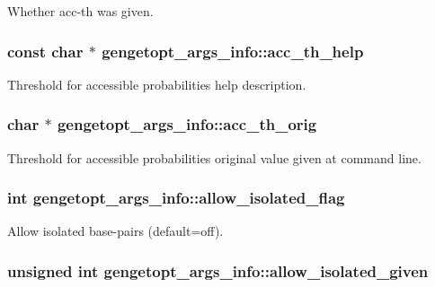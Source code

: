 Whether acc-\/th was given. 

\hypertarget{structgengetopt__args__info_a6c25c2ca04d50ecd361603514540046b}{
\subsubsection[{acc\+\_\+th\+\_\+help}]{\setlength{\rightskip}{0pt plus 5cm}const char $\ast$ gengetopt\+\_\+args\+\_\+info\+::acc\+\_\+th\+\_\+help}}\label{structgengetopt__args__info_a6c25c2ca04d50ecd361603514540046b}


Threshold for accessible probabilities help description. 

\hypertarget{structgengetopt__args__info_ae8040a2293d3668f9afd87c7cc487591}{
\subsubsection[{acc\+\_\+th\+\_\+orig}]{\setlength{\rightskip}{0pt plus 5cm}char $\ast$ gengetopt\+\_\+args\+\_\+info\+::acc\+\_\+th\+\_\+orig}}\label{structgengetopt__args__info_ae8040a2293d3668f9afd87c7cc487591}


Threshold for accessible probabilities original value given at command line. 

\hypertarget{structgengetopt__args__info_a7253dcfc654558789f9bdd5b6e29a3bb}{
\subsubsection[{allow\+\_\+isolated\+\_\+flag}]{\setlength{\rightskip}{0pt plus 5cm}int gengetopt\+\_\+args\+\_\+info\+::allow\+\_\+isolated\+\_\+flag}}\label{structgengetopt__args__info_a7253dcfc654558789f9bdd5b6e29a3bb}


Allow isolated base-\/pairs (default=off). 

\hypertarget{structgengetopt__args__info_a8b05ab428edea135b106a9bcf40344ae}{
\subsubsection[{allow\+\_\+isolated\+\_\+given}]{\setlength{\rightskip}{0pt plus 5cm}unsigned int gengetopt\+\_\+args\+\_\+info\+::allow\+\_\+isolated\+\_\+given}}\label{structgengetopt__args__info_a8b05ab428edea135b106a9bcf40344ae}


